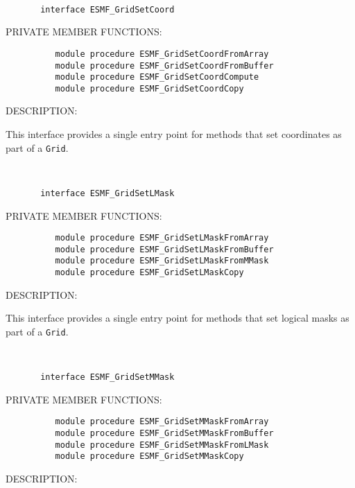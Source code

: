 \mbox{}\hrulefill\ 
 

\begin{verbatim}       interface ESMF_GridSetCoord
 \end{verbatim}{\sf PRIVATE MEMBER FUNCTIONS:}
\begin{verbatim}          module procedure ESMF_GridSetCoordFromArray
          module procedure ESMF_GridSetCoordFromBuffer
          module procedure ESMF_GridSetCoordCompute
          module procedure ESMF_GridSetCoordCopy
 \end{verbatim}
{\sf DESCRIPTION:\\ }


       This interface provides a single entry point for methods that set
       coordinates as part of a {\tt Grid}.
   
 
\mbox{}\hrulefill\ 
 

\begin{verbatim}       interface ESMF_GridSetLMask
 \end{verbatim}{\sf PRIVATE MEMBER FUNCTIONS:}
\begin{verbatim}          module procedure ESMF_GridSetLMaskFromArray
          module procedure ESMF_GridSetLMaskFromBuffer
          module procedure ESMF_GridSetLMaskFromMMask
          module procedure ESMF_GridSetLMaskCopy
 \end{verbatim}
{\sf DESCRIPTION:\\ }


       This interface provides a single entry point for methods that set
       logical masks as part of a {\tt Grid}.
   
 
\mbox{}\hrulefill\ 
 

\begin{verbatim}       interface ESMF_GridSetMMask
 \end{verbatim}{\sf PRIVATE MEMBER FUNCTIONS:}
\begin{verbatim}          module procedure ESMF_GridSetMMaskFromArray
          module procedure ESMF_GridSetMMaskFromBuffer
          module procedure ESMF_GridSetMMaskFromLMask
          module procedure ESMF_GridSetMMaskCopy
 \end{verbatim}
{\sf DESCRIPTION:\\ }


